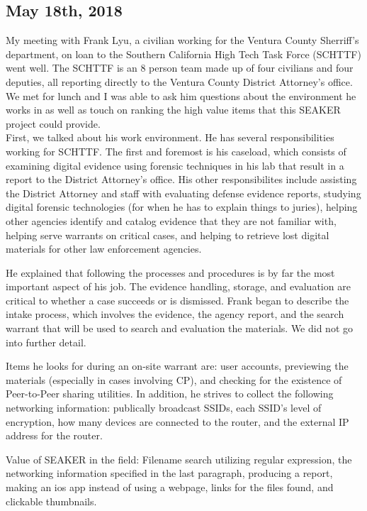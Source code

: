 \documentclass[12pt]{article}
\begin{document}
\subsection{May 18th, 2018}

My meeting with Frank Lyu, a civilian working for the Ventura County Sherriff's department, on loan to
the Southern California High Tech Task Force (SCHTTF) went well.  The SCHTTF is an 8 person team made up of
four civilians and four deputies, all reporting directly to the Ventura County District Attorney's office.
We met for lunch and I was able to ask him questions about the environment he works in as well as touch on
ranking the high value items that this SEAKER project could provide.\\

First, we talked about his work environment.  He has several responsibilities working for SCHTTF.  The first
and foremost is his caseload, which consists of examining digital evidence using forensic techniques in his
lab that result in a report to the District Attorney's office.  His other responsibilites include assisting
the District Attorney and staff with evaluating defense evidence reports, studying digital forensic 
technologies (for when he has to explain things to juries), helping other agencies identify and catalog
evidence that they are not familiar with, helping serve warrants on critical cases, and helping to retrieve
lost digital materials for other law enforcement agencies.

He explained that following the processes and procedures is by far the most important aspect of his job.  The
evidence handling, storage, and evaluation are critical to whether a case succeeds or is dismissed. Frank
began to describe the intake process, which involves the evidence, the agency report, and the search warrant
that will be used to search and evaluation the materials.  We did not go into further detail.

Items he looks for during an on-site warrant are: user accounts, previewing the materials (especially in
cases involving CP), and checking for the existence of Peer-to-Peer sharing utilities.  In addition, he 
strives to collect the following networking information: publically broadcast SSIDs, each SSID's level of
encryption, how many devices are connected to the router, and the external IP address for the router.

Value of SEAKER in the field: Filename search utilizing regular expression, the networking information 
specified in the last paragraph, producing a report, making an ios app instead of using a webpage, links
for the files found, and clickable thumbnails.
\end{document}
